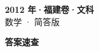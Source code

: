 \documentclass[zihao=-4, a4paper]{ctexart}
\begin{document}
\begin{center}
  {\Large\bfseries 2012 年·福建卷·文科}\\[4pt]
  {\large 数学 · 简答版}
\end{center}
\medskip
{}

\clearpage
{}
\begin{center}{\Large\bfseries 答案速查}\end{center}
\medskip

\end{document}
